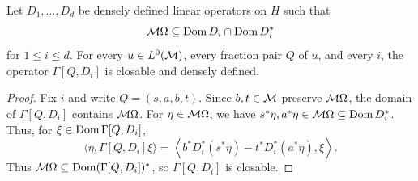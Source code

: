 \begin{lemma}\label{lem:fraction-domains}
Let \(D_1,\ldots,D_d\) be densely defined linear operators on \(H\) such that
\[\mathcal M\Omega\subseteq\operatorname{Dom} D_i\cap\operatorname{Dom} D_i^*\]
for \(1\leq i\leq d\).
For every \(u\in L^0(\mathcal M)\), every fraction pair \(Q\) of \(u\), and every \(i\), the operator \(\Gamma[Q,D_i]\) is closable and densely defined.
\end{lemma}
\begin{proof}
Fix \(i\) and write \(Q=(s,a,b,t)\).
Since \(b,t\in\mathcal M\) preserve \(\mathcal M\Omega\), the domain of \(\Gamma[Q,D_i]\) contains \(\mathcal M\Omega\).
For \(\eta\in\mathcal M\Omega\), we have \(s^*\eta,a^*\eta\in\mathcal M\Omega\subseteq\operatorname{Dom} D_i^*\).
Thus, for \(\xi\in\operatorname{Dom}\Gamma[Q,D_i]\),
\begin{equation}\label{eq:defect-adjoint}
 \langle\eta,\Gamma[Q,D_i]\xi\rangle
 =\left\langle
 b^*D_i^*(s^*\eta)-t^*D_i^*(a^*\eta),\xi
 \right\rangle.
\end{equation}
Thus \(\mathcal M\Omega\subseteq\operatorname{Dom}(\Gamma[Q,D_i])^*\), so \(\Gamma[Q,D_i]\) is closable.
\end{proof}

